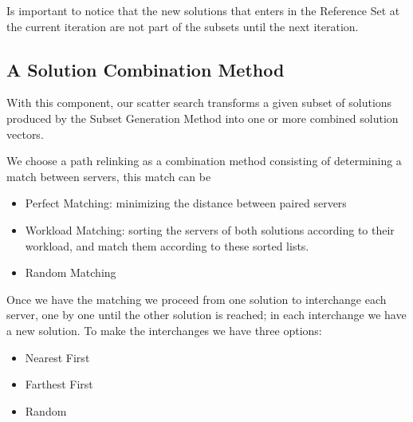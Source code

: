 Is important to notice that
the new solutions that enters in the Reference Set
at the current iteration
are not part of the subsets
until the next iteration.

\subsection{A Solution Combination Method}
With this component,
our scatter search
transforms a given subset of solutions 
produced by the Subset Generation Method
into
one or more combined solution vectors.

We choose a path relinking as a combination method
consisting of
determining a match between servers,
this match can be
\begin{itemize}
\item Perfect Matching:
  minimizing the distance between paired servers
\item Workload Matching:
  sorting the servers of both solutions
  according to their workload,
  and match them according to these sorted lists.
\item Random Matching
\end{itemize}
Once we have the matching
we proceed from one solution
to interchange each server,
one by one
until the other solution is reached;
in each interchange
we have a new solution.
To make the interchanges
we have three options:
\begin{itemize}
\item Nearest First
\item Farthest First
\item Random
\end{itemize}

